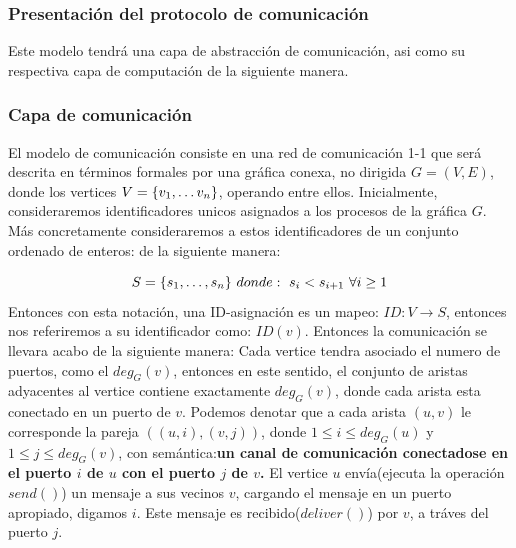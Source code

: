 \documentclass[10pt]{report}
\begin{document}
{    \subsubsection{Presentación del protocolo de comunicación}
    Este modelo tendrá una capa de abstracción de comunicación, asi como su respectiva capa de
    computación de la siguiente manera.
    \subsubsection{Capa de comunicación}
    El modelo de comunicación consiste en una red de comunicación 1-1 que será descrita en términos formales por
    una gráfica conexa, no dirigida $G=(V,E)$, donde los vertices $V=\{ v_{1},\mathellipsis v_{n} \}$,\space
    operando entre ellos.
    Inicialmente, consideraremos identificadores unicos asignados a los procesos de la gráfica $G$.\space
    Más concretamente consideraremos a estos identificadores de un conjunto ordenado de enteros:
    de la siguiente manera:

    \begin{equation}
        S = \{ s_{1},\mathellipsis,s_{n}\} \
        donde:\ s_{i} < s_{i+1} \ \forall i\geq 1\label{eq:equation}
    \end{equation}
    Entonces con esta notación, una ID-asignación es un mapeo:
    $ID:V\rightarrow S$, entonces nos referiremos a su identificador como:
    $ID(v)$. \newline
    Entonces la comunicación se llevara acabo de la siguiente manera: \newline
    Cada vertice tendra asociado el numero de puertos, como el $deg_{G}(v)$,
    entonces en este sentido, el conjunto de aristas adyacentes al vertice
    contiene exactamente $deg_{G}(v)$, donde cada arista esta conectado en un puerto de $v$.
    \newline
    Podemos denotar que a cada arista $(u,v)$ le corresponde la pareja
    $((u,i),(v,j))$, donde $1\leq i \leq deg_{G}(u) $ y $1\leq j \leq deg_{G}(v)$,
    con semántica:\newline \textbf{un canal de comunicación conectadose en el puerto $i$  de $u$ con el puerto $j$ de
    $v$.}\newline
    El vertice $u$ envía(ejecuta la operación $send()$) un mensaje a sus vecinos $v$, cargando el mensaje en un puerto apropiado, digamos $i$.
    Este mensaje es recibido($deliver()$) por $v$, a tráves del puerto $j$. \newline

}
\end{document}
